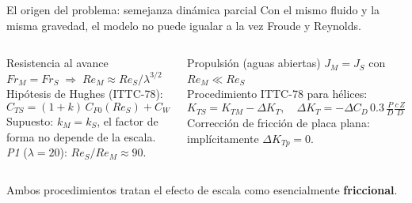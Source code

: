 \documentclass[aspectratio=169,10pt]{beamer}
\newcommand{\mensaje}[1]{\par\vfill\begin{msgbox}\small #1\end{msgbox}}
\newcommand{\uk}{(1+k)}
\newcommand{\Pu}{\textit{P1}}
\begin{document}
\begin{frame}{El origen del problema: semejanza dinámica parcial}
Con el mismo fluido y la misma gravedad, el modelo \alert{no puede igualar a la vez} Froude y Reynolds.
\vspace{0.6em}
\begin{columns}[T]
\begin{block}{Resistencia al avance}
\small
$Fr_M = Fr_S \;\Rightarrow\; Re_M \approx Re_S/\lambda^{3/2}$\\[2pt]
Hipótesis de Hughes (ITTC-78):
\[C_{TS} = \uk\,C_{F0}(Re_S) + C_W\]
Supuesto: \alert{$k_M = k_S$}, el factor de forma no depende de la escala.\\[2pt]
\Pu{} ($\lambda=20$): $Re_S/Re_M \approx 90$.
\end{block}
\begin{block}{Propulsión (aguas abiertas)}
\small
$J_M = J_S$ con $Re_M \ll Re_S$\\[2pt]
Procedimiento ITTC-78 para hélices:
\[K_{TS} = K_{TM} - \Delta K_T,\quad \Delta K_T = -\Delta C_D\,0.3\,\tfrac{P}{D}\tfrac{c\,Z}{D}\]
Corrección de \alert{fricción de placa plana}: implícitamente $\Delta K_{Tp}=0$.
\end{block}
\end{columns}
\mensaje{Ambos procedimientos tratan el efecto de escala como esencialmente \textbf{friccional}.}
\end{frame}
\end{document}
